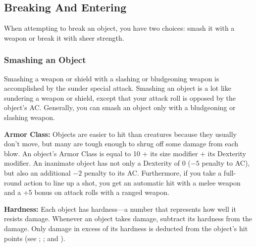 \subsection{Breaking And Entering}
When attempting to break an object, you have two choices: smash it with a weapon or break it with sheer strength.

\subsubsection{Smashing an Object}
Smashing a weapon or shield with a slashing or bludgeoning weapon is accomplished by the sunder special attack. Smashing an object is a lot like sundering a weapon or shield, except that your attack roll is opposed by the object's AC. Generally, you can smash an object only with a bludgeoning or slashing weapon.

\textbf{Armor Class:} Objects are easier to hit than creatures because they usually don't move, but many are tough enough to shrug off some damage from each blow. An object's Armor Class is equal to 10 + its size modifier + its Dexterity modifier. An inanimate object has not only a Dexterity of 0 ($-5$ penalty to AC), but also an additional $-2$ penalty to its AC. Furthermore, if you take a full-round action to line up a shot, you get an automatic hit with a melee weapon and a +5 bonus on attack rolls with a ranged weapon.

\textbf{Hardness:} Each object has hardness---a number that represents how well it resists damage. Whenever an object takes damage, subtract its hardness from the damage. Only damage in excess of its hardness is deducted from the object's hit points (see ; ; and ).

